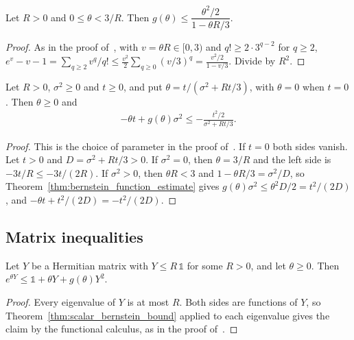 \begin{theorem}
    \label{thm:bernstein_function_estimate}
    \leanok
    Let $R>0$ and $0\le\theta<3/R$. Then
    $g(\theta)\le\dfrac{\theta^{2}/2}{1-\theta R/3}$.
\end{theorem}
\begin{proof}\leanok
    As in the proof of~\cite[Lemma~6.6.2]{Tropp2015Introduction}, with
    $v=\theta R\in[0,3)$ and $q!\ge2\cdot3^{q-2}$ for $q\ge2$,
    $e^{v}-v-1=\sum_{q\ge2}v^{q}/q!\le\frac{v^{2}}{2}\sum_{q\ge0}(v/3)^{q}
        =\frac{v^{2}/2}{1-v/3}$.
    Divide by $R^{2}$.
\end{proof}

\begin{theorem}
    \label{thm:bernstein_exponent}
    \leanok
    Let $R>0$, $\sigma^{2}\ge0$ and $t\ge0$, and put
    $\theta=t/(\sigma^{2}+Rt/3)$, with $\theta=0$ when $t=0$. Then $\theta\ge0$ and
    \begin{align}
        \label{eq:bernstein_exponent}
        -\theta t+g(\theta)\sigma^{2}\le-\frac{t^{2}/2}{\sigma^{2}+Rt/3}.
    \end{align}
\end{theorem}
\begin{proof}\leanok
    This is the choice of parameter in the proof
    of~\cite[Theorem~6.6.1]{Tropp2015Introduction}. If $t=0$ both sides vanish.
    Let $t>0$ and $D=\sigma^{2}+Rt/3>0$. If $\sigma^{2}=0$, then
    $\theta=3/R$ and the left side is $-3t/R\le-3t/(2R)$. If $\sigma^{2}>0$, then
    $\theta R<3$ and $1-\theta R/3=\sigma^{2}/D$, so
    Theorem~\ref{thm:bernstein_function_estimate} gives
    $g(\theta)\sigma^{2}\le\theta^{2}D/2=t^{2}/(2D)$, and
    $-\theta t+t^{2}/(2D)=-t^{2}/(2D)$.
\end{proof}

\subsection{Matrix inequalities}

\begin{theorem}
    \label{thm:bernstein_transfer}
    \leanok
    Let $Y$ be a Hermitian matrix with $Y\le R\,\mathbb{1}$ for some $R>0$, and let
    $\theta\ge0$. Then $e^{\theta Y}\le\mathbb{1}+\theta Y+g(\theta)Y^{2}$.
\end{theorem}
\begin{proof}\leanok
    Every eigenvalue of $Y$ is at most $R$. Both sides are functions of $Y$, so
    Theorem~\ref{thm:scalar_bernstein_bound} applied to each eigenvalue gives the
    claim by the functional calculus, as in the proof
    of~\cite[Lemma~6.7]{Tropp2012User}.
\end{proof}

